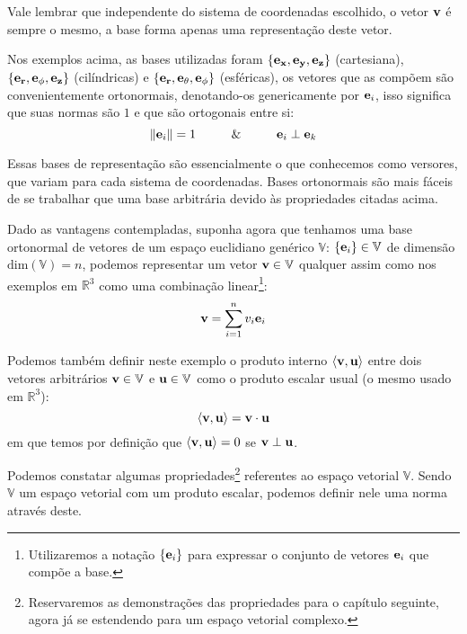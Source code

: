 Vale lembrar que independente do sistema de coordenadas escolhido, o vetor $\vb{v}$ é sempre o mesmo, a base forma apenas uma representação deste vetor.

Nos exemplos acima, as bases utilizadas foram $\{\vb{e_{x}}, \vb{e_{y}}, \vb{e_{z}}\}$ (cartesiana), $\{\vb{e_{r}}, \vb{e_{\phi}}, \vb{e_{z}}\}$ (cilíndricas) e $\{\vb{e_{r}}, \vb{e_{\theta}}, \vb{e_{\phi}}\}$ (esféricas), os vetores que as compõem são convenientemente ortonormais, denotando-os genericamente por $\vb{e}_{i}$, isso significa que suas normas são $1$ e que são ortogonais entre si:
    \begin{equation*}
        \norm{\vb{e}_i} = 1 \hspace{1cm} \& \hspace{1cm} 
        \vb{e}_{i} \perp \vb{e}_{k}
    \end{equation*}

Essas bases de representação são essencialmente o que conhecemos como versores, que variam para cada sistema de coordenadas. Bases ortonormais são mais fáceis de se trabalhar que uma base arbitrária devido às propriedades citadas acima.

Dado as vantagens contempladas, suponha agora que tenhamos uma base ortonormal de vetores de um espaço euclidiano genérico $\mathbb{V}$: $\{\vb{e}_{i}\} \in \mathbb{V}$ de dimensão $\mathrm{dim}(\mathbb{V}) = n$, podemos representar um vetor $\vb{v} \in \mathbb{V}$ qualquer assim como nos exemplos em $\mathbb{R}^3$ como uma combinação linear\footnote{Utilizaremos a notação $\{\vb{e}_{i}\}$ para expressar o conjunto de vetores $\vb{e}_{i}$ que compõe a base.}:
    \begin{equation}\label{vetor}
        \vb{v} = \sum_{i=1}^n v_{i}\vb{e}_{i}
    \end{equation}

Podemos também definir neste exemplo o produto interno $\langle \vb{v} , \vb{u}\rangle$ entre dois vetores arbitrários $\vb{v} \in \mathbb{V}$ e $\vb{u} \in \mathbb{V}$ como o produto escalar usual (o mesmo usado em $\mathbb{R}^3$):
\begin{equation*}
    \langle \vb{v} , \vb{u}\rangle = \vb{v} \cdot \vb{u}
\end{equation*}
em que temos por definição que $\langle\vb{v},\vb{u}\rangle = 0$ se $\vb{v}\perp\vb{u}$. 

Podemos constatar algumas propriedades\footnote{Reservaremos as demonstrações das propriedades para o capítulo seguinte, agora já se estendendo para um espaço vetorial complexo.} referentes ao espaço vetorial $\mathbb{V}$. Sendo $\mathbb{V}$ um espaço vetorial com um produto escalar, podemos definir nele uma norma através deste.

